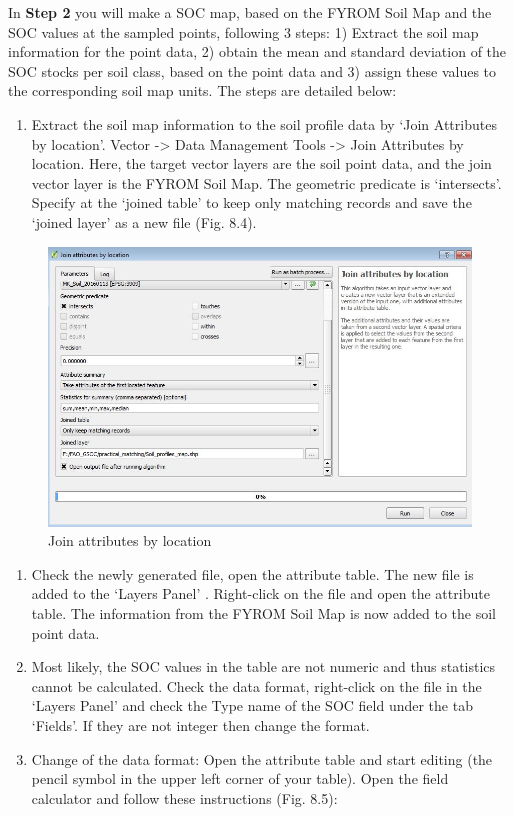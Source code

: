 \documentclass[10pt,b5paper,]{book}
\providecommand{\tightlist}{%
  \setlength{\itemsep}{0pt}\setlength{\parskip}{0pt}}
\theoremstyle{definition}
\theoremstyle{definition}
\theoremstyle{definition}
\theoremstyle{remark}
\begin{document}
In \textbf{Step 2} you will make a SOC map, based on the FYROM Soil Map
and the SOC values at the sampled points, following 3 steps: 1) Extract
the soil map information for the point data, 2) obtain the mean and
standard deviation of the SOC stocks per soil class, based on the point
data and 3) assign these values to the corresponding soil map units. The
steps are detailed below:

\begin{enumerate}
\def\labelenumi{\arabic{enumi}.}
\tightlist
\item
  Extract the soil map information to the soil profile data by `Join
  Attributes by location'. Vector -\textgreater{} Data Management Tools
  -\textgreater{} Join Attributes by location. Here, the target vector
  layers are the soil point data, and the join vector layer is the FYROM
  Soil Map. The geometric predicate is `intersects'. Specify at the
  `joined table' to keep only matching records and save the `joined
  layer' as a new file (Fig. 8.4).
\end{enumerate}

\begin{figure}

{\centering \includegraphics[width=0.8\linewidth]{images/Conv_upscaling4} 

}

\caption{Join attributes by location}\label{fig:unnamed-chunk-30}
\end{figure}

\begin{enumerate}
\def\labelenumi{\arabic{enumi}.}
\setcounter{enumi}{1}
\tightlist
\item
  Check the newly generated file, open the attribute table. The new file
  is added to the `Layers Panel' . Right-click on the file and open the
  attribute table. The information from the FYROM Soil Map is now added
  to the soil point data.
\item
  Most likely, the SOC values in the table are not numeric and thus
  statistics cannot be calculated. Check the data format, right-click on
  the file in the `Layers Panel' and check the Type name of the SOC
  field under the tab `Fields'. If they are not integer then change the
  format.
\item
  Change of the data format: Open the attribute table and start editing
  (the pencil symbol in the upper left corner of your table). Open the
  field calculator and follow these instructions (Fig. 8.5):
\end{enumerate}
\end{document}
